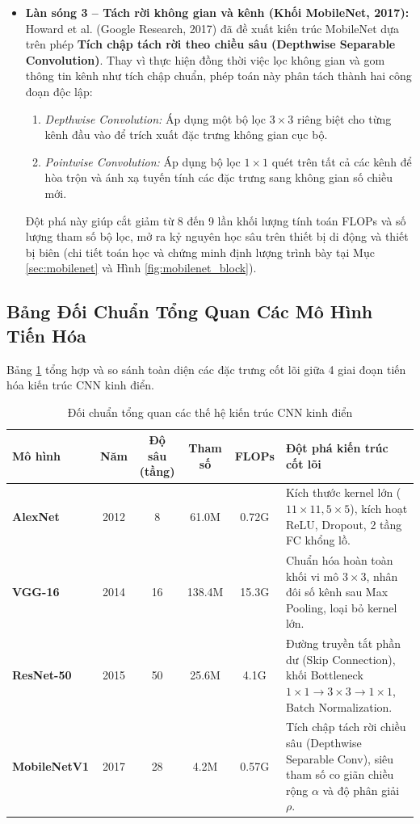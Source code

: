 \documentclass[12pt,a4paper]{report}
\begin{document}
\begin{itemize}[leftmargin=2em]
    \item \textbf{Làn sóng 3 -- Tách rời không gian và kênh (Khối MobileNet, 2017):}
    Howard et al. (Google Research, 2017) đã đề xuất kiến trúc MobileNet dựa trên phép \textbf{Tích chập tách rời theo chiều sâu (Depthwise Separable Convolution)}. Thay vì thực hiện đồng thời việc lọc không gian và gom thông tin kênh như tích chập chuẩn, phép toán này phân tách thành hai công đoạn độc lập:
    \begin{enumerate}
        \item \textit{Depthwise Convolution:} Áp dụng một bộ lọc $3 \times 3$ riêng biệt cho từng kênh đầu vào để trích xuất đặc trưng không gian cục bộ.
        \item \textit{Pointwise Convolution:} Áp dụng bộ lọc $1 \times 1$ quét trên tất cả các kênh để hòa trộn và ánh xạ tuyến tính các đặc trưng sang không gian số chiều mới.
    \end{enumerate}
    Đột phá này giúp cắt giảm từ 8 đến 9 lần khối lượng tính toán FLOPs và số lượng tham số bộ lọc, mở ra kỷ nguyên học sâu trên thiết bị di động và thiết bị biên (chi tiết toán học và chứng minh định lượng trình bày tại Mục \ref{sec:mobilenet} và Hình \ref{fig:mobilenet_block}).
\end{itemize}

\subsection{Bảng Đối Chuẩn Tổng Quan Các Mô Hình Tiến Hóa}
Bảng \ref{tab:cnn_evolution_summary} tổng hợp và so sánh toàn diện các đặc trưng cốt lõi giữa 4 giai đoạn tiến hóa kiến trúc CNN kinh điển.

\begin{table}[H]
\centering
\small
\caption{Đối chuẩn tổng quan các thế hệ kiến trúc CNN kinh điển}
\label{tab:cnn_evolution_summary}
\begin{tabularx}{\textwidth}{lccccX}
\toprule
\textbf{Mô hình} & \textbf{Năm} & \textbf{Độ sâu (tầng)} & \textbf{Tham số} & \textbf{FLOPs} & \textbf{Đột phá kiến trúc cốt lõi} \\
\midrule
\textbf{AlexNet} & 2012 & 8 & 61.0M & 0.72G & Kích thước kernel lớn ($11 \times 11, 5 \times 5$), kích hoạt ReLU, Dropout, 2 tầng FC khổng lồ. \\
\addlinespace
\textbf{VGG-16} & 2014 & 16 & 138.4M & 15.3G & Chuẩn hóa hoàn toàn khối vi mô $3 \times 3$, nhân đôi số kênh sau Max Pooling, loại bỏ kernel lớn. \\
\addlinespace
\textbf{ResNet-50} & 2015 & 50 & 25.6M & 4.1G & Đường truyền tắt phần dư (Skip Connection), khối Bottleneck $1\times 1 \to 3\times 3 \to 1\times 1$, Batch Normalization. \\
\addlinespace
\textbf{MobileNetV1} & 2017 & 28 & 4.2M & 0.57G & Tích chập tách rời chiều sâu (Depthwise Separable Conv), siêu tham số co giãn chiều rộng $\alpha$ và độ phân giải $\rho$. \\
\bottomrule
\end{tabularx}
\end{table}
\end{document}

